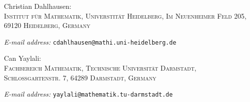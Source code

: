 \documentclass[colorinlistoftodos,article,11pt,reqno]{article}
\begin{document}






\bigskip
  \footnotesize

  Christian Dahlhausen:\\  \textsc{Institut für Mathematik, Universtität Heidelberg, Im Neuenheimer Feld 205, 69120 Heidelberg, Germany}\par\nopagebreak
  \textit{E-mail address:}  \texttt{cdahlhausen@mathi.uni-heidelberg.de}

  \medskip

  Can Yaylali:\\ \textsc{Fachbereich Mathematik, Technische Universität Darmstadt, Schlossgartenstr. 7, 64289 Darmstadt, Germany}\par\nopagebreak
  \textit{E-mail address:} \texttt{yaylali@mathematik.tu-darmstadt.de}
\end{document}
